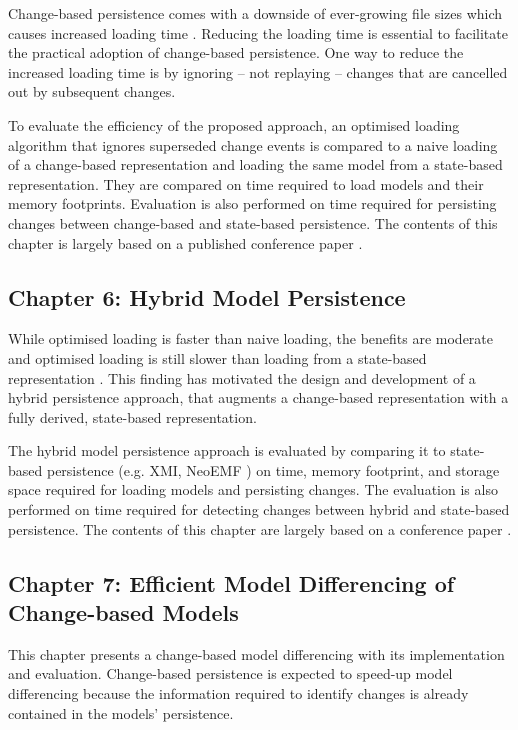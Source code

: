 Change-based persistence comes with a downside of ever-growing file sizes \cite{DBLP:journals/entcs/RobbesL07,DBLP:conf/edoc/KoegelHLHD10} which causes increased loading time \cite{mens2002state}. Reducing the loading time is essential to facilitate the practical adoption of change-based persistence. One way to reduce the increased loading time is by ignoring -- not replaying -- changes that are cancelled out by subsequent changes. 

To evaluate the efficiency of the proposed approach, an optimised loading algorithm that ignores superseded change events is compared to a naive loading of a change-based representation and loading the same model from a state-based representation. They are compared on time required to load models and their memory footprints. Evaluation is also performed on time required for persisting changes between change-based and state-based persistence. The contents of this chapter is largely based on a published conference paper \cite{yohannis2018towards}. 

\subsection{Chapter 6: Hybrid Model Persistence}
\label{sec:chapter_5_hybrid_model_persistence}
While optimised loading is faster than naive loading, the benefits are moderate and optimised loading is still slower than loading from a state-based representation \cite{DBLP:conf/models/YohannisRPK18}. This finding has motivated the design and development of a hybrid persistence approach, that augments a change-based representation with a fully derived, state-based representation. 

The hybrid model persistence approach is evaluated by comparing it to state-based persistence (e.g. XMI, NeoEMF \cite{daniel2016neoemf}) on time, memory footprint, and storage space required for loading models and persisting changes. The evaluation is also performed on time required for detecting changes between hybrid and state-based persistence. The contents of this chapter are largely based on a conference paper \cite{DBLP:conf/models/YohannisRPK18}.

\subsection{Chapter 7: Efficient Model Differencing of Change-based Models}
\label{sec:chapter_6_model_differencing}
This chapter presents a change-based model differencing with its implementation and evaluation. Change-based persistence is expected to speed-up model differencing because the information required to identify changes is already contained in the models' persistence. 

